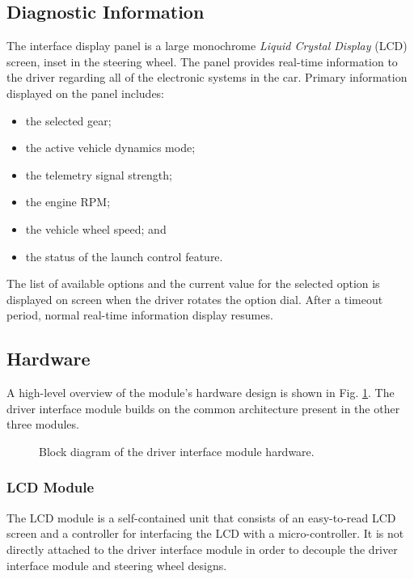 \subsection{Diagnostic Information}
\label{sec:interface_diag}

The interface display panel is a large monochrome \emph{Liquid Crystal Display} (LCD) screen, inset in the steering wheel. The panel provides real-time information to the driver regarding all of the electronic systems in the car. Primary information displayed on the panel includes:

\begin{itemize}
\item the selected gear;
\item the active vehicle dynamics mode;
\item the telemetry signal strength;
\item the engine RPM;
\item the vehicle wheel speed; and
\item the status of the launch control feature.
\end{itemize}

The list of available options and the current value for the selected option is displayed on screen when the driver rotates the option dial. After a timeout period, normal real-time information display resumes. 

\subsection{Hardware}

A high-level overview of the module's hardware design is shown in Fig. \ref{fig:interface_hardware_design_block}. The driver interface module builds on the common architecture present in the other three modules. 

\begin{figure}[H]
\centering

\caption{Block diagram of the driver interface module hardware.}
\label{fig:interface_hardware_design_block}
\end{figure}

\subsubsection{LCD Module}

The LCD module is a self-contained unit that consists of an easy-to-read LCD screen and a controller for interfacing the LCD with a micro-controller. It is not directly attached to the driver interface module in order to decouple the driver interface module and steering wheel designs.

